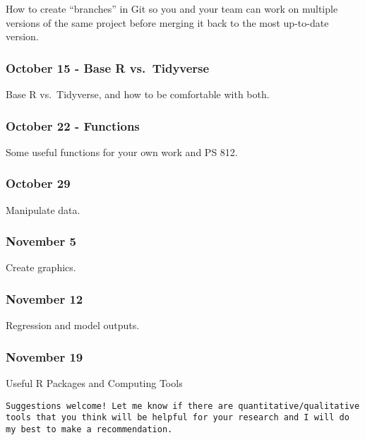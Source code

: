 \documentclass[11pt,]{article}
\begin{document}
How to create ``branches'' in Git so you and your team can work on
multiple versions of the same project before merging it back to the most
up-to-date version.

\hypertarget{october-15---base-r-vs.-tidyverse}{%
\subsubsection{October 15 - Base R
vs.~Tidyverse}\label{october-15---base-r-vs.-tidyverse}}

Base R vs.~Tidyverse, and how to be comfortable with both.

\hypertarget{october-22---functions}{%
\subsubsection{October 22 - Functions}\label{october-22---functions}}

Some useful functions for your own work and PS 812.

\hypertarget{october-29}{%
\subsubsection{October 29}\label{october-29}}

Manipulate data.

\hypertarget{november-5}{%
\subsubsection{November 5}\label{november-5}}

Create graphics.

\hypertarget{november-12}{%
\subsubsection{November 12}\label{november-12}}

Regression and model outputs.

\hypertarget{november-19}{%
\subsubsection{November 19}\label{november-19}}

Useful R Packages and Computing Tools

\begin{verbatim}
Suggestions welcome! Let me know if there are quantitative/qualitative tools that you think will be helpful for your research and I will do my best to make a recommendation.
\end{verbatim}
\end{document}
